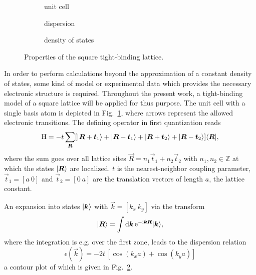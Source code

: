\begin{figure}
    \small
    \begin{subfigure}[b]{4.666cm}
        \centering
        
        \caption{unit cell}
        \label{square-lattice unit cell}
    \end{subfigure}%
    \begin{subfigure}[b]{4.666cm}
        
        \caption{dispersion}
        \label{square-lattice dispersion}
    \end{subfigure}%
    \begin{subfigure}[b]{4.666cm}
        
        \caption{density of states}
        \label{square-lattice dos}
    \end{subfigure}
    \caption[Square lattice]
        {Properties of the square tight-binding lattice.}
\end{figure}
%
In order to perform calculations beyond the approximation of a constant density
of states, some kind of model or experimental data which provides the necessary
electronic structure is required. Throughout the present work, a tight-binding
model of a square lattice will be applied for thus purpose. The unit cell with a
single basis atom is depicted in Fig.~\ref{square-lattice unit cell}, where
arrows represent the allowed electronic transitions. The defining
 operator in first quantization reads
%
\begin{equation*}
    \mathrm H = -t \sum_{\boldsymbol R}
         [ |\boldsymbol R + \boldsymbol t_1\rangle
         + |\boldsymbol R - \boldsymbol t_1\rangle
         + |\boldsymbol R + \boldsymbol t_2\rangle
         + |\boldsymbol R - \boldsymbol t_2\rangle ]
    \langle\boldsymbol R|,
\end{equation*}
%
where the sum goes over all lattice sites $\vec R = n_1 \vec t_1 + n_2 \vec t_2$
with $n_1, n_2 \in \mathds Z$ at which the  states $|\boldsymbol R\rangle$
are localized. $t$ is the nearest-neighbor coupling parameter, $\vec t_1 = [a \
0]$ and $\vec t_2 = [0 \ a]$ are the translation vectors of length $a$, the
lattice constant.

An expansion into  states $|\boldsymbol k\rangle$ with $\vec k = [k_x \ k_y]$
via the \name{Fourier} transform
%
\begin{equation*}
    |\boldsymbol R\rangle = \int \mathrm d \boldsymbol k \, \mathrm e^{-\mathrm i \boldsymbol k \boldsymbol R} |\boldsymbol k\rangle,
\end{equation*}
%
where the integration is e.g. over the first  zone, leads to the
dispersion relation
%
\begin{equation*}
    \epsilon(\vec k) = -2 t \, [\cos(k_x a) + \cos(k_y a)]
\end{equation*}
%
a contour plot of which is given in Fig.~\ref{square-lattice dispersion}.

